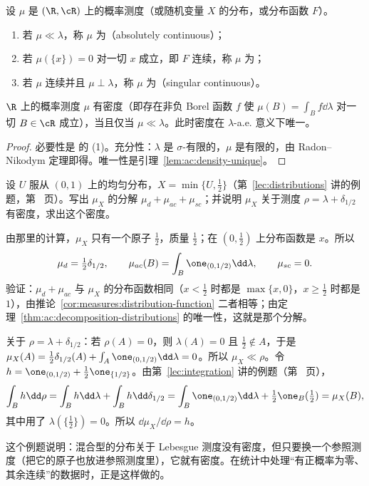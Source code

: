 \begin{definition}\label{def:ac:types}
设 $\mu$ 是 $(\R,\cR)$ 上的概率测度（或随机变量 $X$ 的分布，或分布函数 $F$）。
\begin{enumerate}
\item 若 $\mu\ll\lambda$，称 $\mu$ 为（absolutely continuous）；
\item 若 $\mu(\{x\})=0$ 对一切 $x$ 成立，即 $F$ 连续，称 $\mu$ 为；
\item 若 $\mu$ 连续并且 $\mu\perp\lambda$，称 $\mu$ 为（singular continuous）。
\end{enumerate}
\end{definition}

\begin{theorem}[绝对连续的分布有密度]\label{thm:ac:ac-density}
$\R$ 上的概率测度 $\mu$ 有密度（即存在非负 Borel 函数 $f$ 使 $\mu(B)=\int_Bf\dd\lambda$ 对一切 $B\in\cR$ 成立），当且仅当 $\mu\ll\lambda$。此时密度在 $\lambda$-a.e. 意义下唯一。
\end{theorem}
\begin{proof}
必要性是 的 (1)。充分性：$\lambda$ 是 $\sigma$-有限的，$\mu$ 是有限的，由 Radon--Nikodym 定理即得。唯一性是引理~\ref{lem:ac:density-unique}。
\end{proof}

\begin{workedexample}\label{we:ac:mixed-decomposition}
设 $U$ 服从 $(0,1)$ 上的均匀分布，$X=\min\{U,\frac12\}$（第~\ref{lec:distributions} 讲的例题，第~\pageref{we:distributions:mixed} 页）。写出 $\mu_X$ 的分解 $\mu_d+\mu_{ac}+\mu_{sc}$；并说明 $\mu_X$ 关于测度 $\rho=\lambda+\delta_{1/2}$ 有密度，求出这个密度。
\end{workedexample}
\begin{solution}
由那里的计算，$\mu_X$ 只有一个原子 $\frac12$，质量 $\frac12$；在 $(0,\frac12)$ 上分布函数是 $x$。所以
\[
\mu_d=\tfrac12\delta_{1/2},\qquad\mu_{ac}(B)=\int_B\one_{(0,1/2)}\dd\lambda,\qquad\mu_{sc}=0 .
\]
验证：$\mu_d+\mu_{ac}$ 与 $\mu_X$ 的分布函数相同（$x<\frac12$ 时都是 $\max\{x,0\}$，$x\geqslant\frac12$ 时都是 $1$），由推论~\ref{cor:measures:distribution-function} 二者相等；由定理~\ref{thm:ac:decomposition-distributions} 的唯一性，这就是那个分解。

关于 $\rho=\lambda+\delta_{1/2}$：若 $\rho(A)=0$，则 $\lambda(A)=0$ 且 $\frac12\notin A$，于是 $\mu_X(A)=\frac12\delta_{1/2}(A)+\int_A\one_{(0,1/2)}\dd\lambda=0$。所以 $\mu_X\ll\rho$。令 $h=\one_{(0,1/2)}+\frac12\one_{\{1/2\}}$。由第~\ref{lec:integration} 讲的例题（第~\pageref{we:integration:four-step} 页），
\[
\int_Bh\dd\rho=\int_Bh\dd\lambda+\int_Bh\dd\delta_{1/2}=\int_B\one_{(0,1/2)}\dd\lambda+\tfrac12\one_B(\tfrac12)=\mu_X(B),
\]
其中用了 $\lambda(\{\frac12\})=0$。所以 $\dd\mu_X/\dd\rho=h$。

这个例题说明：混合型的分布关于 Lebesgue 测度没有密度，但只要换一个参照测度（把它的原子也放进参照测度里），它就有密度。在统计中处理“有正概率为零、其余连续”的数据时，正是这样做的。
\end{solution}

